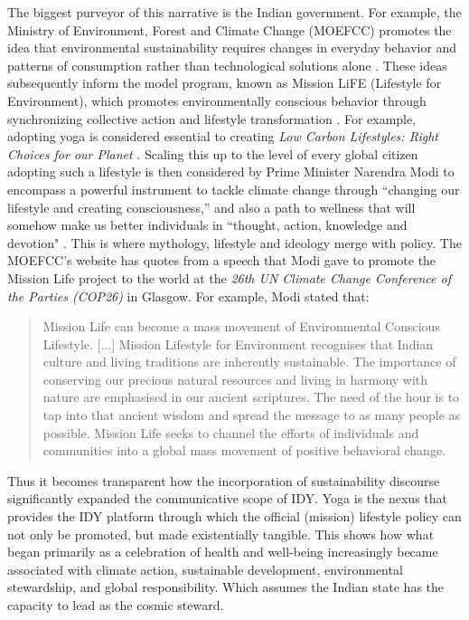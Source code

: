 \documentclass[11pt]{article}
\begin{document}
The biggest purveyor of this narrative is the Indian government. For example, the Ministry of Environment, Forest and Climate Change (MOEFCC) promotes the idea  that environmental sustainability requires changes in everyday behavior and patterns of consumption rather than technological solutions alone \cite{moefcc2016}. These ideas subsequently inform the model program, known as Mission LiFE (Lifestyle for Environment), which promotes environmentally conscious behavior through synchronizing collective action and lifestyle transformation \cite{moefcc2026}. For example, adopting yoga is considered essential to creating \textit{Low Carbon Lifestyles: Right Choices for our Planet} \cite{moefcc2016}. Scaling this up to the level of every global citizen adopting such a lifestyle is then considered by Prime Minister Narendra Modi to encompass a powerful instrument to tackle climate change through “changing our lifestyle and creating consciousness,” and also a path to wellness that will somehow make us better individuals in “thought, action, knowledge and devotion" \cite{indiandiplomacy2017,un2016a,un2016b,un2019}. This is where mythology, lifestyle and ideology merge with policy. The MOEFCC's website has quotes from a speech that Modi gave to promote the Mission Life project to the world at the \textit{26th UN Climate Change Conference of the Parties (COP26)} in Glasgow. For example, Modi stated that:

\begin{quote}
Mission Life can become a mass movement of Environmental Conscious Lifestyle. [...] Mission Lifestyle for Environment recognises that Indian culture and living traditions are inherently sustainable. The importance of conserving our precious natural resources and living in harmony with nature are emphasised in our ancient scriptures. The need of the hour is to tap into that ancient wisdom and spread the message to as many people as possible. Mission Life seeks to channel the efforts of individuals and communities into a global mass movement of positive behavioral change. 
 \cite{moefcc2026}
\end{quote}

Thus it becomes transparent how the incorporation of sustainability discourse significantly expanded the communicative scope of IDY. Yoga is the nexus that provides the IDY platform through which the official (mission) lifestyle policy can not only be promoted, but made existentially tangible. This shows how what began primarily as a celebration of health and well-being increasingly became associated with climate action, sustainable development, environmental stewardship, and global responsibility. Which assumes the Indian state has the capacity to lead as the cosmic steward.
\end{document}
